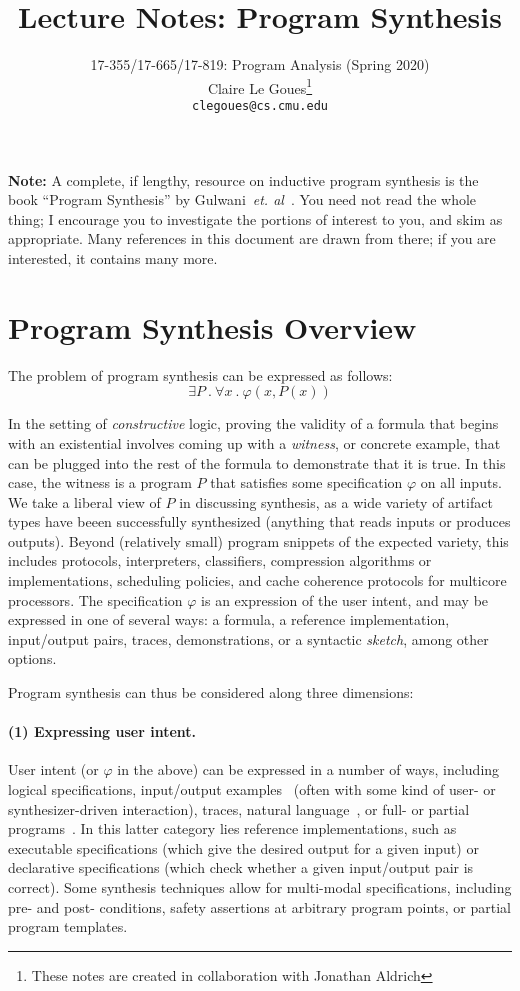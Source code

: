 \documentclass[11pt]{article}
\title{Lecture Notes: Program Synthesis}
\author{17-355/17-665/17-819: Program Analysis (Spring 2020)\\
        Claire Le Goues\footnote{These notes are created in collaboration with
          Jonathan Aldrich}\\
		{\tt clegoues@cs.cmu.edu}}
\date{}
\begin{document}
\maketitle

\noindent\textbf{Note:} A complete, if lengthy, resource on inductive program
synthesis is the book ``Program Synthesis'' by
Gulwani~\emph{et. al}~\cite{synthesisBook}.  You need not read the whole thing;
I encourage you to investigate the portions of interest to you, and skim as
appropriate. Many references in this document are drawn from there; if you are
interested, it contains many more.

\section{Program Synthesis Overview}

The problem of program synthesis can be expressed as follows:
\[
\exists P~.~ \forall x~.~ \varphi (x, P(x))
\]

In the setting of \textit{constructive} logic, proving the validity of a formula
that begins with an existential involves coming up with a \textit{witness}, or
concrete example, that can be plugged into the rest of the formula to demonstrate
that it is true.
In this case, the witness is a program $P$ that satisfies some specification
$\varphi$ on all inputs.  
We take a liberal view of $P$ in discussing synthesis, as a wide
variety of artifact types have beeen successfully synthesized (anything that reads
inputs or produces outputs).  Beyond (relatively small) program snippets of the
expected variety, this includes protocols, interpreters, classifiers,
compression algorithms or implementations, scheduling policies, and cache coherence
protocols for multicore processors.  The specification $\varphi$ is an
expression of the user intent, and may be expressed in one of several ways: a
formula, a reference implementation, input/output pairs, traces, demonstrations,
or a syntactic \emph{sketch}, among other options.

Program synthesis can thus be considered along three dimensions: 

\paragraph{(1) Expressing user intent.} User intent (or $\varphi$ in the above) can be expressed in a number of
ways, including logical specifications, input/output examples~\cite{Gulwani2016} (often with some
kind of user- or synthesizer-driven interaction), traces, natural language~\cite{Desai2016,Gulwani2014,Le2013}, or full- or partial programs~\cite{sketch}.
In this latter category lies reference implementations, such as executable
specifications (which give the desired output for a given input) or declarative
specifications (which check whether a given input/output pair is correct).
Some synthesis techniques allow for multi-modal specifications, including pre-
and post- conditions, safety assertions at arbitrary program points, or partial
program templates.
\end{document}
